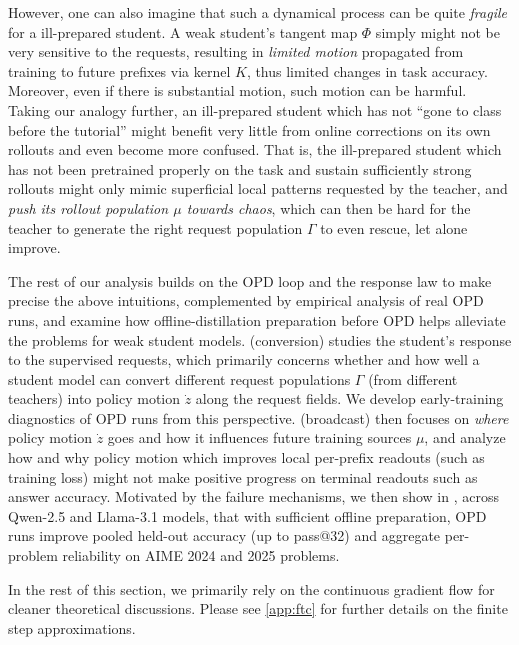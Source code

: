 However, one can also imagine that such a dynamical process can be quite \emph{fragile} for a ill-prepared student. A weak student's tangent map $\Phi$ simply might not be very sensitive to the requests, resulting in \emph{limited motion} propagated from training to future prefixes via kernel $K$, thus limited changes in task accuracy. Moreover, even if there is substantial motion, such motion can be harmful. Taking our analogy further, an ill-prepared student which has not ``gone to class before the tutorial'' might benefit very little from online corrections on its own rollouts and even become more confused. That is, the ill-prepared student which has not been pretrained properly on the task and sustain sufficiently strong rollouts might only mimic superficial local patterns requested by the teacher, and \emph{push its rollout population $\mu$ towards chaos}, which can then be hard for the teacher to generate the right request population $\Gamma$ to even rescue, let alone improve.

The rest of our analysis builds on the OPD loop and the response law to make precise the above intuitions, complemented by empirical analysis of real OPD runs, and examine how offline-distillation preparation before OPD helps alleviate the problems for weak student models.  (conversion) studies the student’s response to the supervised requests, which primarily concerns whether and how well a student model can convert different request populations $\Gamma$ (from different teachers) into policy motion $\dot{z}$ along the request fields. We develop early-training diagnostics of OPD runs from this perspective.  (broadcast) then focuses on \emph{where} policy motion $\dot{z}$ goes and how it influences future training sources $\mu$, and analyze how and why policy motion which improves local per-prefix readouts (such as training loss) might not make positive progress on terminal readouts such as answer accuracy. Motivated by the failure mechanisms, we then show in , across Qwen-2.5 and Llama-3.1 models, that with sufficient offline preparation, OPD runs improve pooled held-out accuracy (up to pass@32) and aggregate per-problem reliability on AIME 2024 and 2025 problems.

In the rest of this section, we primarily rely on the continuous gradient flow for cleaner theoretical discussions. Please see \cref{app:ftc} for further details on the finite step approximations. 